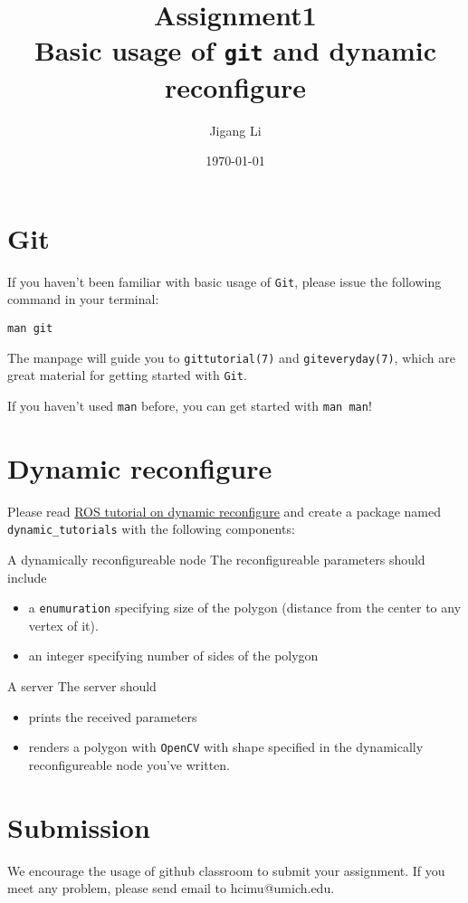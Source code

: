 \documentclass[a4paper]{article}
\author{Jigang Li}
\date{\today}
\title{Assignment1\\\medskip
\large Basic usage of \texttt{git} and dynamic reconfigure}
\begin{document}
\maketitle

\section{Git}
\label{sec:org5a4c4e4}

If you haven't been familiar with basic usage of \texttt{Git}, please issue the
following command in your terminal:

\begin{verbatim}
man git
\end{verbatim}

The manpage will guide you to \texttt{gittutorial(7)} and \texttt{giteveryday(7)}, which
are great material for getting started with \texttt{Git}.

If you haven't used \texttt{man} before, you can get started with \texttt{man man}!

\section{Dynamic reconfigure}
\label{sec:org4ac6042}

Please read  \href{http://wiki.ros.org/dynamic\_reconfigure/Tutorials}{ROS tutorial on dynamic reconfigure} and create a package
named \texttt{dynamic\_tutorials} with the following components:

\begin{component}{A dynamically reconfigureable node} {}
The reconfigureable parameters should include
\begin{itemize}
\item a \texttt{enumuration} specifying size of the polygon (distance from the
center to any vertex of it).
\item an integer specifying number of sides of the polygon
\end{itemize}
\end{component}


\begin{component}{A server} {}
The server should
\begin{itemize}
\item prints the received parameters
\item renders a polygon with \texttt{OpenCV} with shape specified in the
dynamically reconfigureable node you've written.
\end{itemize}
\end{component}

\section{Submission}
\label{sec:org7b4406e}

We encourage the usage of github classroom to submit your
assignment. If you meet any problem, please send email to
hcimu@umich.edu.
\end{document}
